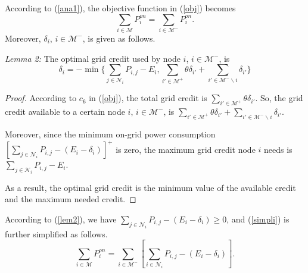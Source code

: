 \documentclass[journal,12pt,onecolumn]{IEEEtran}
\begin{document}
According to (\ref{ana1}), the objective function in (\ref{obj}) becomes 
\begin{equation}\label{simpli}
\sum\limits_{i\in\mathcal{M}}{P_i^{on}}=\sum\limits_{i\in\mathcal{M}^-}{P_i^{on}}.
\end{equation}
Moreover, $\delta_i$, $i\in\mathcal{M}^-$, is given as follows.

\emph{Lemma 2:} The optimal grid credit used by node $i$, $i\in\mathcal{M}^-$, is 
\begin{equation}\label{lem2}
\delta_i=-\min\{\sum\limits_{j\in\mathcal{N}_i}P_{i,j}-E_i,\sum\limits_{i'\in\mathcal{M}^+}\theta\delta_{i'}+\sum\limits_{i'\in\mathcal{M}^-\backslash{i}}\delta_{i'}\}\end{equation}
\begin{proof}
According to $c_6$ in (\ref{obj}), the total grid credit is $\sum\nolimits_{i'\in\mathcal{M}^+}\theta\delta_{i'}$. So, the grid credit available to a certain node $i$, $i\in\mathcal{M}^-$, is $\sum\nolimits_{i'\in\mathcal{M}^+}\theta\delta_{i'}+\sum\nolimits_{i'\in\mathcal{M}^-\backslash{i}}\delta_{i'}$. 

Moreover, since the minimum on-grid power consumption $\left[\sum\nolimits_{j \in\mathcal{N}_i} {{P_{i,j}}} - (E_i-\delta_i)\right]^+$ is zero, the maximum grid credit node $i$ needs is $\sum\nolimits_{j\in\mathcal{N}_i}P_{i,j}-E_i$.

As a result, the optimal grid credit is the minimum value of the available credit and the maximum needed credit.
\end{proof}



According to (\ref{lem2}), we have $\sum\nolimits_{j \in\mathcal{N}_i} {{P_{i,j}}} - (E_i-\delta_i)\ge 0$, and (\ref{simpli}) is further simplified as follows.
\begin{equation}\label{red1}
\sum\limits_{i\in\mathcal{M}}{P_i^{on}}=\sum\limits_{i\in\mathcal{M}^-}[{\sum\limits_{i\in\mathcal{N}_i}P_{i,j}}-(E_i-\delta_i)].
\end{equation}
\end{document}
